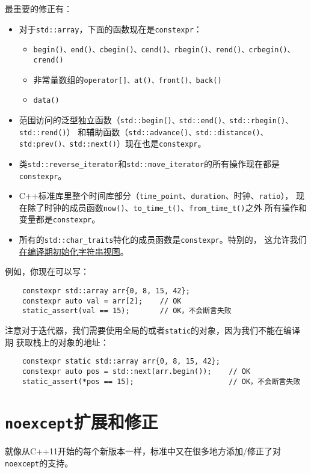 最重要的修正有：
\begin{itemize}
    \item 对于\texttt{std::array}，下面的函数现在是\texttt{constexpr}：
    \begin{itemize}
        \item \texttt{begin()、end()、cbegin()、cend()、rbegin()、rend()、crbegin()、crend()}
        \item 非常量数组的\texttt{operator[]、at()、front()、back()}
        \item \texttt{data()}
    \end{itemize}
    \item 范围访问的泛型独立函数（\texttt{std::begin()、std::end()、std::rbegin()、std::rend()}）
    和辅助函数（\texttt{std::advance()、std::distance()、std:prev()、std::next()}）现在也是\texttt{constexpr}。
    \item 类\texttt{std::reverse\_iterator}和\texttt{std::move\_iterator}的所有操作现在都是\texttt{constexpr}。
    \item C++标准库里整个时间库部分（\texttt{time\_point}、\texttt{duration}、时钟、\texttt{ratio}），
    现在除了时钟的成员函数\texttt{now()}、\texttt{to\_time\_t()}、\texttt{from\_time\_t()}之外
    所有操作和变量都是\texttt{constexpr}。
    \item 所有的\texttt{std::char\_traits}特化的成员函数是\texttt{constexpr}。特别的，
    这允许我们\hyperref[编译期字符串视图]{在编译期初始化字符串视图}。
\end{itemize}
例如，你现在可以写：
\begin{lstlisting}
    constexpr std::array arr{0, 8, 15, 42};
    constexpr auto val = arr[2];    // OK
    static_assert(val == 15);       // OK，不会断言失败
\end{lstlisting}
注意对于迭代器，我们需要使用全局的或者\texttt{static}的对象，因为我们不能在编译期
获取栈上的对象的地址：
\begin{lstlisting}
    constexpr static std::array arr{0, 8, 15, 42};
    constexpr auto pos = std::next(arr.begin());    // OK
    static_assert(*pos == 15);                      // OK，不会断言失败
\end{lstlisting}

\section{\texttt{noexcept}扩展和修正}
就像从C++11开始的每个新版本一样，标准中又在很多地方添加/修正了对\texttt{noexcept}的支持。

